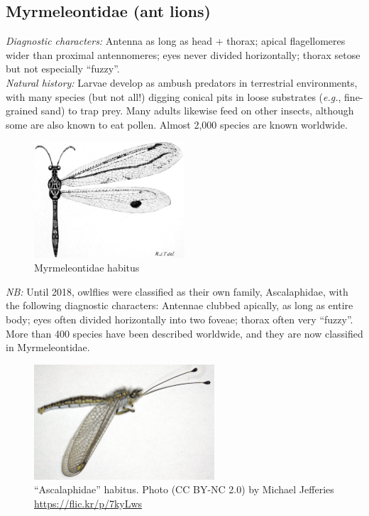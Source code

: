 \documentclass[letterpaper, 11pt]{article}
\begin{document}
\subsection{Myrmeleontidae (ant lions)}
\noindent{}\textit{Diagnostic characters:} Antenna as long as head + thorax; apical flagellomeres wider than proximal antennomeres; eyes never divided horizontally; thorax setose but not especially ``fuzzy''.\\

\noindent{}\textit{Natural history:} Larvae develop as ambush predators in terrestrial environments, with many species (but not all!) digging conical pits in loose substrates (\textit{e.g.}, fine-grained sand) to trap prey. Many adults likewise feed on other insects, although some are also known to eat pollen. Almost 2,000 species are known worldwide.\\

\begin{figure}[ht!]
  \centering
    \includegraphics[width=0.5\textwidth]{figures/MyrmeleontidHabitus}
  \caption{Myrmeleontidae habitus \citep[][Fig. III.8]{tillyard1916}}
  \label{fig:myrmeleo}
\end{figure}

\noindent{}\textit{NB:} Until 2018, owlflies were classified as their own family, Ascalaphidae, with the following diagnostic characters: Antennae clubbed apically, as long as entire body; eyes often divided horizontally into two foveae; thorax often very ``fuzzy''. More than 400 species have been described worldwide, and they are now classified in Myrmeleontidae.\\

\begin{figure}[ht!]
  \centering
    \includegraphics[width=0.6\textwidth]{figures/AscalaphidHabitus}
  \caption{``Ascalaphidae'' habitus. Photo (CC BY-NC 2.0) by Michael Jefferies \url{https://flic.kr/p/7kyLws}}
  \label{fig:ascalaph}
\end{figure}
\end{document}
